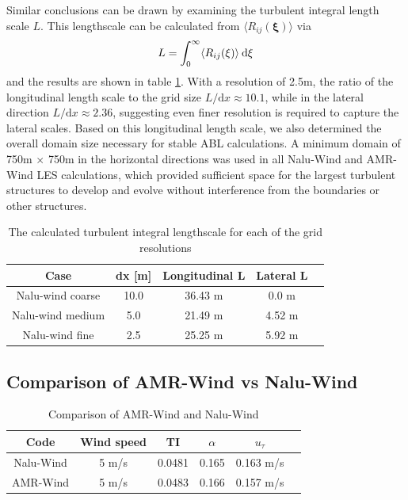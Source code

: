 Similar conclusions can be drawn by examining the turbulent integral
length scale $L$.  This lengthscale can be calculated from $\langle
R_{ij}(\boldsymbol{\xi}) \rangle$ via
\begin{equation}
  L = \int_0^\infty \langle R_{ij}(\xi) \rangle \: {\textrm d}\xi
\end{equation}
and the results are shown in table \ref{tab:GridStudyLscale}.  With a
resolution of 2.5m, the ratio of the longitudinal length scale to the
grid size $L/\textrm{d}x \approx 10.1$, while in the lateral direction
$L/\textrm{d}x \approx 2.36$, suggesting even finer resolution is
required to capture the lateral scales.  Based on this longitudinal
length scale, we also determined the overall domain size necessary for
stable ABL calculations.  A minimum domain of 750m $\times$ 750m in
the horizontal directions was used in all Nalu-Wind and AMR-Wind LES
calculations, which provided sufficient space for the largest
turbulent structures to develop and evolve without interference from
the boundaries or other structures.

\begin{table}[h!]
\caption{\label{tab:GridStudyLscale} The calculated turbulent integral
  lengthscale for each of the grid resolutions} \centering
\begin{tabular}{ccccc}
  \hline
  Case              & dx [m] & Longitudinal L  & Lateral L \\
  \hline
  Nalu-wind coarse  &  10.0  & 36.43 m         & 0.0 m     \\
  Nalu-wind medium  &   5.0  & 21.49 m         & 4.52 m    \\
  Nalu-wind fine    &   2.5  & 25.25 m         & 5.92 m    \\
\hline
\end{tabular}
\end{table}

\subsection{Comparison of AMR-Wind vs Nalu-Wind}

\begin{table}
\caption{\label{tab:CompareAMRvsNalu} Comparison of AMR-Wind and Nalu-Wind} \centering
\begin{tabular}{cccccc}
  \hline
  Code & Wind speed & TI      &  $\alpha$  &   $u_\tau$ \\ %
  \hline
  Nalu-Wind & 5 m/s &  0.0481 &  0.165     &  0.163 m/s \\ %
  AMR-Wind  & 5 m/s &  0.0483 &  0.166     &  0.157 m/s \\ %
  \hline
\end{tabular}
\end{table}

